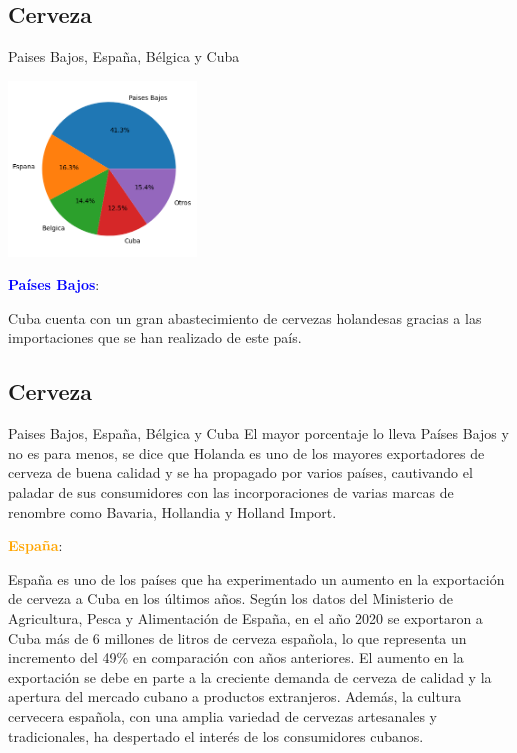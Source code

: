 \subsection{Cerveza}
\begin{frame}[fragile]{Paises Bajos, España, Bélgica y Cuba}
  \begin{center}
    \includegraphics[width=5cm]{paises.png}
    \end{center}
    \textbf{\textcolor{blue}{Países Bajos}}:

    Cuba cuenta con un gran abastecimiento de cervezas holandesas gracias a las importaciones que se han realizado de este país. 
  
\end{frame}

\subsection{Cerveza}
\begin{frame}[fragile]{Paises Bajos, España, Bélgica y Cuba}
  El mayor porcentaje lo lleva Países Bajos y no es para menos, 
  se dice que Holanda es uno de los mayores exportadores de cerveza de buena calidad y se ha propagado por varios países, 
  cautivando el paladar de sus consumidores con las incorporaciones de varias marcas de renombre como Bavaria, Hollandia y Holland Import.
  
  \textbf{\textcolor{orange}{España}}:
  
  España es uno de los países que ha experimentado un aumento en la exportación de cerveza a Cuba en los últimos años. 
  Según los datos del Ministerio de Agricultura, Pesca y Alimentación de España, en el año 2020 se exportaron a Cuba más de 6 millones de litros de cerveza española, lo que representa un incremento del 49\% en comparación con años anteriores. 
  El aumento en la exportación se debe en parte a la creciente demanda de cerveza de calidad y la apertura del mercado cubano a productos extranjeros. 
  Además, la cultura cervecera española, con una amplia variedad de cervezas artesanales y tradicionales, ha despertado el interés de los consumidores cubanos.
\end{frame}

